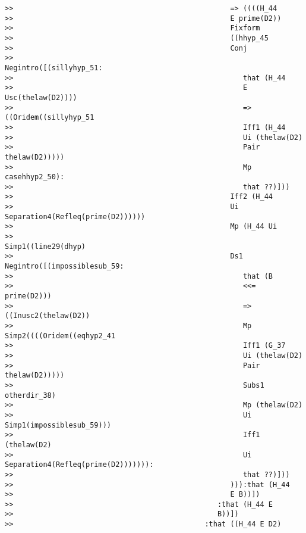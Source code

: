 \documentclass[12pt]{article}
\begin{document}
\begin{verbatim}
>>                                                   => ((((H_44
>>                                                   E prime(D2))
>>                                                   Fixform
>>                                                   ((hhyp_45
>>                                                   Conj
>>                                                   Negintro([(sillyhyp_51:
>>                                                      that (H_44
>>                                                      E Usc(thelaw(D2))))
>>                                                      => ((Oridem((sillyhyp_51
>>                                                      Iff1 (H_44
>>                                                      Ui (thelaw(D2)
>>                                                      Pair thelaw(D2)))))
>>                                                      Mp casehhyp2_50):
>>                                                      that ??)]))
>>                                                   Iff2 (H_44
>>                                                   Ui Separation4(Refleq(prime(D2))))))
>>                                                   Mp (H_44 Ui
>>                                                   Simp1((line29(dhyp)
>>                                                   Ds1 Negintro([(impossiblesub_59:
>>                                                      that (B
>>                                                      <<= prime(D2)))
>>                                                      => ((Inusc2(thelaw(D2))
>>                                                      Mp Simp2((((Oridem((eqhyp2_41
>>                                                      Iff1 (G_37
>>                                                      Ui (thelaw(D2)
>>                                                      Pair thelaw(D2)))))
>>                                                      Subs1 otherdir_38)
>>                                                      Mp (thelaw(D2)
>>                                                      Ui Simp1(impossiblesub_59)))
>>                                                      Iff1 (thelaw(D2)
>>                                                      Ui Separation4(Refleq(prime(D2))))))):
>>                                                      that ??)]))
>>                                                   ))):that (H_44
>>                                                   E B))])
>>                                                :that (H_44 E
>>                                                B))])
>>                                             :that ((H_44 E D2)

\end{verbatim}
\end{document}
